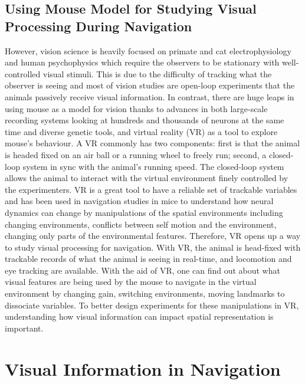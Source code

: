 \subsection{Using Mouse Model for Studying Visual Processing During Navigation}
However, vision science is heavily focused on primate and cat electrophysiology and human psychophysics which require the observers to be stationary with well-controlled visual stimuli. This is due to the difficulty of tracking what the observer is seeing and most of vision studies are open-loop experiments that the animals passively receive visual information. In contrast, there are huge leaps in using mouse as a model for vision thanks to advances in both large-scale recording systems looking at hundreds and thousands of neurons at the same time and diverse genetic tools, and virtual reality (VR) as a tool to explore mouse's behaviour. A VR commonly has two components: first is that the animal is headed fixed on an air ball or a running wheel to freely run; second, a closed-loop system in sync with the animal's running speed. The closed-loop system allows the animal to interact with the virtual environment finely controlled by the experimenters. VR is a great tool to have a reliable set of trackable variables and has been used in navigation studies in mice to understand how neural dynamics can change by manipulations of the spatial environments including changing environments, conflicts between self motion and the environment, changing only parts of the environmental features. Therefore, VR opens up a way to study visual processing for navigation. With VR, the animal is head-fixed with trackable records of what the animal is seeing in real-time, and locomotion and eye tracking are available. With the aid of VR, one can find out about what visual features are being used by the mouse to navigate in the virtual environment by changing gain, switching environments, moving landmarks to dissociate variables. To better design experiments for these manipulations in VR, understanding how visual information can impact spatial representation is important.


\section{Visual Information in Navigation}
